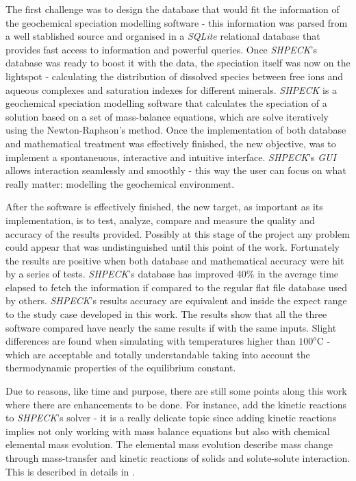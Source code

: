 The first challenge was to design the database that would fit the information of the geochemical speciation modelling software - this information was parsed from a well stablished source and organised in a \emph{SQLite} relational database that provides fast access to information and powerful queries. Once \emph{SHPECK}'s database was ready to boost it with the data, the speciation itself was now on the lightspot - calculating the distribution of dissolved species between free ions and aqueous complexes and saturation indexes for different minerals. \emph{SHPECK} is a geochemical speciation modelling software that calculates the speciation of a solution based on a set of mass-balance equations, which are solve iteratively using the Newton-Raphson's method.
Once the implementation of both database and mathematical treatment was effectively finished, the new objective, was to implement a spontaneuous, interactive and intuitive interface. \emph{SHPECK}'s \emph{GUI} allows interaction seamlessly and smoothly - this way the user can focus on what really matter: modelling the geochemical environment.

After the software is effectively finished, the new target, as important as its implementation, is to test, analyze, compare and measure the quality and accuracy of the results provided. Possibly at this stage of the project any problem could appear that was undistinguished until this point of the work. 
Fortunately the results are positive when both database and mathematical accuracy were hit by a series of tests. 
\emph{SHPECK}'s database has improved 40\% in the average time elapsed to fetch the  information if compared to the regular flat file database used by others. 
\emph{SHPECK}'s results accuracy are equivalent and inside the expect range to the study case developed in this work. The results show that all the three software compared have nearly the same results if with the same inputs. Slight differences are found when simulating with temperatures higher than $100^o$C - which are acceptable and totally understandable taking into account the thermodynamic properties of the equilibrium constant.

Due to reasons, like time and purpose, there are still some points along this work where there are enhancements to be done. For instance, add the kinetic reactions to \emph{SHPECK}'s solver - it is a really delicate topic since adding kinetic reactions implies not only working with mass balance equations but also with chemical elemental mass evolution. The elemental mass evolution describe mass change through mass-transfer and kinetic reactions of solids and solute-solute interaction. This is described in details in \cite{Ajpark:14}.

